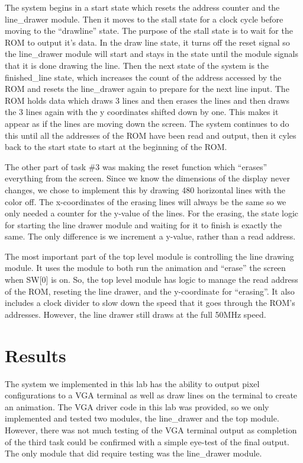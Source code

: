 \documentclass[11pt, titlepage]{article}
\begin{document}
            The system begins in a start state which resets the address counter and the line\_drawer module. Then it moves to the stall state for a clock cycle before moving to the “drawline” state. The purpose of the stall state is to wait for the ROM to output it's data. In the draw line state, it turns off the reset signal so the line\_drawer module will start and stays in the state until the module signals that it is done drawing the line. Then the next state of the system is the finished\_line state, which increases the count of the address accessed by the ROM and resets the line\_drawer again to prepare for the next line input. The ROM holds data which draws 3 lines and then erases the lines and then draws the 3 lines again with the y coordinates shifted down by one. This makes it appear as if the lines are moving down the screen. The system continues to do this until all the addresses of the ROM have been read and output, then it cyles back to the start state to start at the beginning of the ROM. 

            The other part of task \#3 was making the reset function which ``erases'' everything from the screen. Since we know the dimensions of the display never changes, we chose to implement this by drawing 480 horizontal lines with the color off. The x-coordinates of the erasing lines will always be the same so we only needed a counter for the y-value of the lines. For the erasing, the state logic for starting the line drawer module and waiting for it to finish is exactly the same. The only difference is we increment a y-value, rather than a read address. 

           

            The most important part of the top level module is controlling the line drawing module. It uses the module to both run the animation and ``erase'' the screen when SW[0] is on. So, the top level module has logic to manage the read address of the ROM, reseting the line drawer, and the y-coordinate for ``erasing''. It also includes a clock divider to slow down the speed that it goes through the ROM's addresses. However, the line drawer still draws at the full 50MHz speed.

    \newpage
    \section{Results}
        The system we implemented in this lab has the ability to output pixel configurations to a VGA terminal as well as draw lines on the terminal to create an animation. The VGA driver code in this lab was provided, so we only implemented and tested two modules, the line\_drawer and the top module. However, there was not much testing of the VGA terminal output as completion of the third task could be confirmed with a simple eye-test of the final output. The only module that did require testing was the line\_drawer module. 
\end{document}
